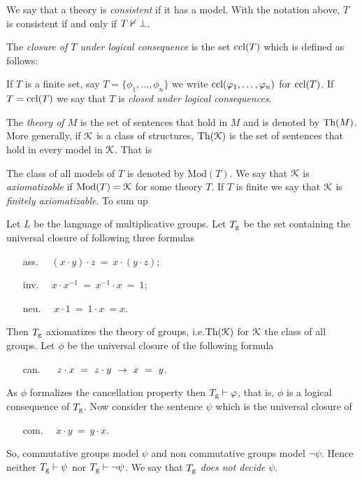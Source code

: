 \documentclass[creche.tex]{subfiles}
\begin{document}
We say that a theory is \emph{consistent\/} if it has a model. With the notation above, $T$ is consistent if and only if \emph{$T\nvdash\bot$}.


The \emph{closure of $T$ under logical consequence\/} is the set ${\rm ccl}(T)$ which is defined as follows:  


If $T$ is a finite set, say $T=\big\{\phi_1,\dots,\phi_n\big\}$ we write ${\rm ccl}(\varphi_1,\dots,\varphi_n)$ for ${\rm ccl}(T)$. If $T={\rm ccl}(T)$ we say that $T$ is \emph{closed under logical consequences}.

The \emph{theory of $M$\/} is the set of sentences that hold in $M$ and is denoted by \emph{$\textrm{Th}(M)$}. More generally, if $\EuScript K$ is a class of structures, \emph{$\textrm{Th}(\EuScript K)$} is the set of sentences that hold in every model in $\EuScript K$. That is


The class of all models of $T$ is denoted by \emph{$\textrm{Mod}(T)$}. We say that $\EuScript K$ is \emph{axiomatizable\/} if $\mathop{\rm Mod}(T)=\EuScript K$ for some theory $T$. If $T$ is finite we say that $\EuScript K$ is \emph{finitely axiomatizable}. To sum up





\begin{example}\label{Tg}
Let $L$ be the language of multiplicative groups. Let $T_{\rm g}$ be the set containing the universal closure of following three formulas
\begin{itemize}
\item[ass.]\ \  $(x\cdot y)\cdot z\ =\ x\cdot(y\cdot z)$;
\item[inv.]\ \  $ x\cdot x^{-1}\ =\ x^{-1}\cdot x\ =\ 1$;
\item[neu.]\ \  $x\cdot 1\ =\ 1\cdot x\ =x$.
\end{itemize}
Then $T_{\rm g}$ axiomatizes the theory of groups, i.e.\@ $\textrm{Th}(\EuScript K)$ for $\EuScript K$ the class of all groups. Let $\phi$ be the universal closure of the following formula
\begin{itemize}
\item[can.]\ \  $\ z\cdot x\ =\  z\cdot y\ \imp\ x\ =\ y$. 
\end{itemize}
As $\phi$ formalizes the cancellation property then $T_{\rm g} \vdash\varphi$, that is, $\phi$ is a logical consequence of $T_{\rm g}$. Now consider the sentence $\psi$ which is the universal closure of
\begin{itemize}
\item[com.]\ \  $x\cdot y\ =\ y\cdot x$. 
\end{itemize}
So, commutative groups model $\psi$ and non commutative groups model $\neg\psi$. Hence neither $T_{\rm g}\vdash\psi$ nor $T_{\rm g}\vdash\neg\psi$. We say that $T_{\rm g}$ \emph{does not decide\/} $\psi$.\QED
\end{example}
\end{document}
